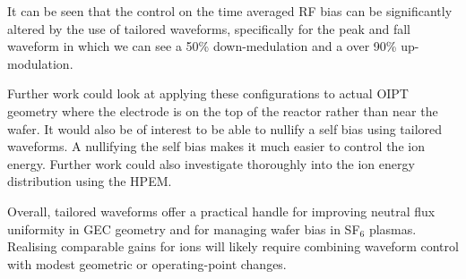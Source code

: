 \documentclass[12pt]{article}
\begin{document}
It can be seen that the control on the time averaged RF bias can be significantly altered by the use of tailored waveforms, specifically for the peak and fall waveform in which we can see a 50\% down-medulation and a over 90\% up-modulation.

Further work could look at applying these configurations to actual OIPT geometry where the electrode is on the top of the reactor rather than near the wafer. It would also be of interest to be able to nullify a self bias using tailored waveforms. A nullifying the self bias makes it much easier to control the ion energy. Further work could also investigate thoroughly into the ion energy distribution using the HPEM.

Overall, tailored waveforms offer a practical handle for improving neutral flux uniformity in GEC geometry and for managing wafer bias in SF$_6$ plasmas. Realising comparable gains for ions will likely require combining waveform control with modest geometric or operating-point changes.




\newpage
\printbibliography
\end{document}
